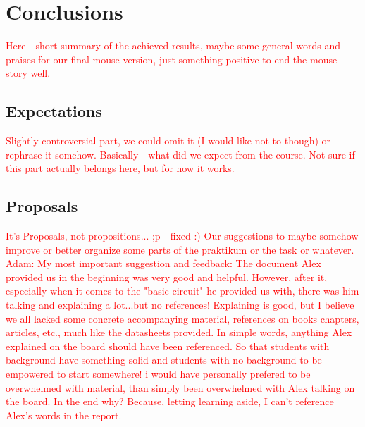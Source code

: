 \section{Conclusions}
\textcolor{red}{
Here - short summary of the achieved results, maybe some general words and praises for our final mouse version, just something positive to end the mouse story well.
}

\subsection{Expectations}
\textcolor{red}{
Slightly controversial part, we could omit it (I would like not to though) or rephrase it somehow. Basically - what did we expect from the course. Not sure if this part actually belongs here, but for now it works.
}
\subsection{Proposals}
\textcolor{red}{It's Proposals, not propositions... ;p - fixed :)}
\textcolor{red}{
Our suggestions to maybe somehow improve or better organize some parts of the praktikum or the task or whatever.
Adam: My most important suggestion and feedback:
The document Alex provided us in the beginning was very good and helpful. However, after it, especially when it comes to the
"basic circuit" he provided us with, there was him talking and explaining a lot...but no references!
Explaining is good, but I believe we all lacked some concrete accompanying material, references on books chapters, articles, etc.,
much like the datasheets provided.
In simple words, anything Alex explained on the board should have been referenced. So that students with background have something
solid and students with no background to be empowered to start somewhere!
i would have personally prefered to be overwhelmed with material, than simply been overwhelmed with Alex talking on the board.
In the end why? Because, letting learning aside, I can't reference Alex's words in the report.
}

